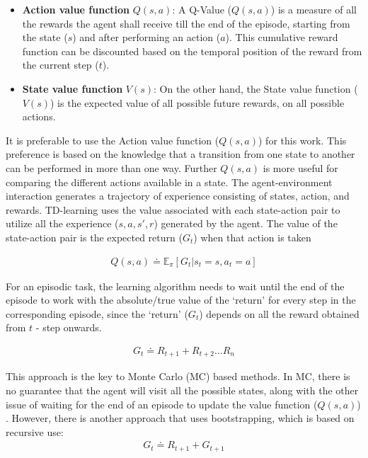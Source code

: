 \begin{itemize}
    \item \textbf{Action value function }$Q(s, a)$: A Q-Value ($Q(s, a)$) is a measure of all the rewards the agent shall receive till the end of the episode, starting from the state ($s$) and after performing an action ($a$). This cumulative reward function can be discounted based on the temporal position of the reward from the current step ($t$).
    \item \textbf{State value function} $V(s)$: On the other hand, the State value function ($V(s)$) is the expected value of all possible future rewards, on all possible actions.
\end{itemize}

It is preferable to use the Action value function ($Q(s, a)$) for this work. This preference is based on the knowledge that a transition from one state to another can be performed in more than one way. Further $Q(s, a)$ is more useful for comparing the different actions available in a state. 
The agent-environment interaction generates a trajectory of experience consisting of states, action, and rewards. 
TD-learning uses the value associated with each state-action pair to utilize all the experience ($s, a, s', r$) generated by the agent.
The value of the state-action pair is the expected return ($G_t$) when that action is taken

\begin{align}
    Q(s, a) \doteq \mathds{E}_{\pi} [G_t|s_t = s, a_t=a] \label{eqn:MDP_Q_function_intro}
\end{align}

For an episodic task, the learning algorithm needs to wait until the end of the episode to work with the absolute/true value of the `return' for every step in the corresponding episode, since the `return' ($G_t$) depends on all the reward obtained from $t$ - step onwards.

\begin{align}
    G_t \doteq R_{t+1} + R_{t+2} \hdots R_n
\end{align}

This approach is the key to Monte Carlo (MC) based methods. 
In MC, there is no guarantee that the agent will visit all the possible states, along with the other issue of waiting for the end of an episode to update the value function ($Q(s,a)$) \parencite{singh1996reinforcement}. 
However, there is another approach that uses bootstrapping, which is based on recursive use:
\begin{align}
    G_t \doteq R_{t+1} + G_{t+1} \label{eqn:MDP_recursive_return}
\end{align}

